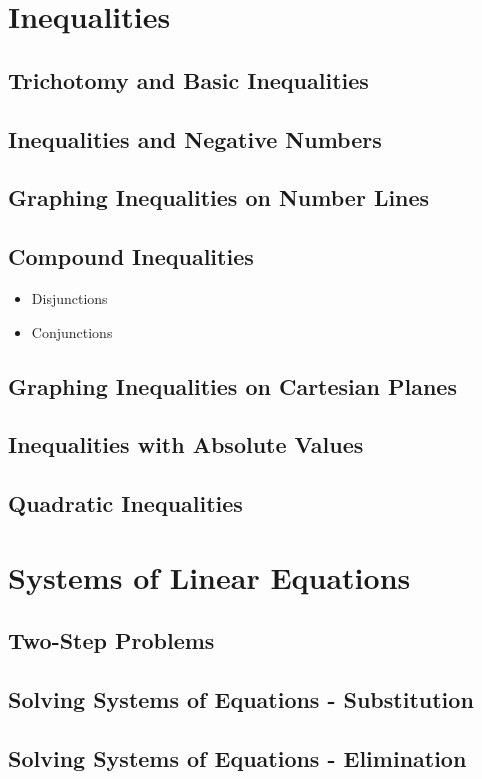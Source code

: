 \documentclass[11pt]{article}
\begin{document}
\setcounter{section}{5}
\section{Inequalities}
\subsection{Trichotomy and Basic Inequalities}
\subsection{Inequalities and Negative Numbers}
\subsection{Graphing Inequalities on Number Lines}
\subsection{Compound Inequalities}
\begin{itemize}
    \item Disjunctions
    \item Conjunctions
\end{itemize}
\subsection{Graphing Inequalities on Cartesian Planes}
\subsection{Inequalities with Absolute Values}
\subsection{Quadratic Inequalities}

\setcounter{section}{6}
\section{Systems of Linear Equations}
\subsection{Two-Step Problems}
\subsection{Solving Systems of Equations - Substitution}
\subsection{Solving Systems of Equations - Elimination}
\end{document}
